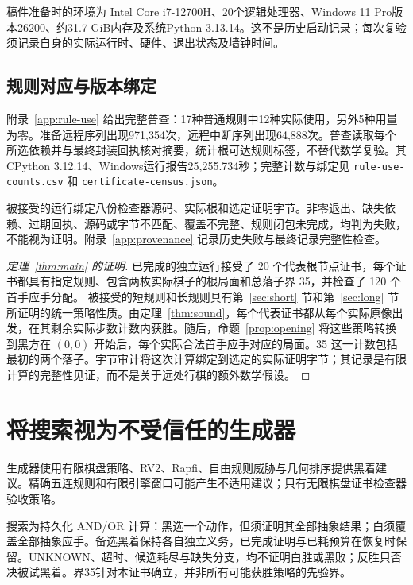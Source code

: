 \documentclass[11pt]{article}
\theoremstyle{definition}
\theoremstyle{remark}
\newcommand{\code}[1]{\texttt{#1}}
\begin{document}
稿件准备时的环境为 Intel Core i7-12700H、20个逻辑处理器、Windows 11 Pro版本26200、约31.7 GiB内存及系统Python 3.13.14。这不是历史启动记录；每次复验须记录自身的实际运行时、硬件、退出状态及墙钟时间。


\subsection{规则对应与版本绑定}
附录~\ref{app:rule-use} 给出完整普查：17种普通规则中12种实际使用，另外5种用量为零。准备远程序列出现971,354次，远程中断序列出现64,888次。普查读取每个所选依赖并与最终封装回执核对摘要，统计根可达规则标签，不替代数学复验。其CPython 3.12.14、Windows运行报告25,255.734秒；完整计数与绑定见 \code{rule-use-counts.csv} 和 \code{certificate-census.json}。

被接受的运行绑定八份检查器源码、实际根和选定证明字节。非零退出、缺失依赖、过期回执、源码或字节不匹配、覆盖不完整、规则闭包未完成，均判为失败，不能视为证明。附录~\ref{app:provenance} 记录历史失败与最终记录完整性检查。

\begin{proof}[定理~\ref{thm:main} 的证明]
已完成的独立运行接受了 20 个代表根节点证书，每个证书都具有指定规则、包含两枚实际棋子的根局面和总落子界 35，并检查了 120 个首手应手分配。
被接受的短规则和长规则具有第~\ref{sec:short} 节和第~\ref{sec:long} 节所证明的统一策略性质。由定理~\ref{thm:sound}，每个代表证书都从每个实际原像出发，在其剩余实际步数计数内获胜。随后，命题~\ref{prop:opening} 将这些策略转换到黑方在 $(0,0)$ 开始后，每个实际合法首手应手对应的局面。35 这一计数包括最初的两个落子。字节审计将这次计算绑定到选定的实际证明字节；其记录是有限计算的完整性见证，而不是关于远处行棋的额外数学假设。
\end{proof}


\section{将搜索视为不受信任的生成器}\label{sec:search}
生成器使用有限棋盘策略、RV2、Rapfi、自由规则威胁与几何排序提供黑着建议。精确五连规则和有限引擎窗口可能产生不适用建议；只有无限棋盘证书检查器验收策略。

搜索为持久化 AND/OR 计算：黑选一个动作，但须证明其全部抽象结果；白须覆盖全部抽象应手。备选黑着保持各自独立义务，已完成证明与已耗预算在恢复时保留。UNKNOWN、超时、候选耗尽与缺失分支，均不证明白胜或黑败；反胜只否决被试黑着。界35针对本证书确立，并非所有可能获胜策略的先验界。
\end{document}
